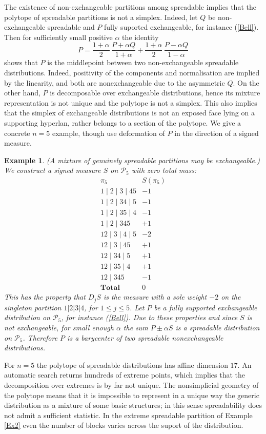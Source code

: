 \documentclass{article}
\newtheorem{example}{Example}
\begin{document}
The existence of non-exchangeable partitions among spreadable implies that the polytope of spreadable partitions is not a simplex.
Indeed, let $Q$ be non-exchangeable spreadable and $P$ fully suported exchangeable, for instance (\ref{Bell}). Then  for sufficiently small
positive $\alpha$ the identity
$$ P=\frac{1+\alpha}{2}  \,\frac{P+\alpha Q}{1+\alpha}+ \frac{1+\alpha}{2}\,  \frac{P-\alpha Q}{1-\alpha}$$
shows that $P$ is the middlepoint between two non-exchangeable spreadable distributions. Indeed, positivity of the components and normalisation are implied by the linearity,
and both are nonexchangeable due to the asymmetric $Q$. On the other hand, $P$ is decomposable over exchangeable distributions, hence its mixture  representation is not unique
and the polytope is not a simplex. 
This also implies that the simplex of exchangeable distributions is not an exposed face lying on a supporting hyperlan, rather belongs to a section of the polytope.
We give a concrete $n=5$ example, though use deformation of $P$ in the direction of a signed measure.


\begin{example}\label{Ex3}{\rm
(A mixture of genuinely spreadable partitions may be exchangeable.)
 We construct a {\it signed} measure $S$ on ${\mathcal P}_5$ with zero total mass:
\[
\begin{array}{l|r}
\pi_5 & S(\pi_5) \\
\hline
1 \mid 2 \mid 3 \mid 45 & -1 \\
1 \mid 2 \mid 34 \mid 5 & -1 \\
1 \mid 2 \mid 35 \mid 4 & -1 \\
1 \mid 2 \mid 345      & +1 \\[1mm]
12 \mid 3 \mid 4 \mid 5 & -2 \\[1mm]
12 \mid 3 \mid 45      & +1 \\
12 \mid 34 \mid 5      & +1 \\
12 \mid 35 \mid 4      & +1 \\
12 \mid 345            & -1 \\
\hline
\textbf{Total} & 0
\end{array}
\]
This has the property that $D_j S$ is the measure with a sole weight $-2$ on the singleton partition $1|2|3|4$,
for $1\leq j\leq 5$. Let $P$ be a fully supported exchangeable distribution on $\mathcal P_5$, for instance (\ref{Bell}).
Due to these properties and since $S$ is not exchangeable, for small enough $\alpha$ the sum $P\pm\alpha S$ is a spreadable distribution on $\mathcal P_5$. Therefore $P$ is a barycenter of two spreadable nonexchangeable distributions.
}
\end{example}
\vskip0.0cm
For $n=5$ the polytope of spreadable distributions has affine dimension $17$.
An automatic search returns hundreds of extreme points, which implies that the
decomposition over  extremes  is by far not unique.
The nonsimplicial geometry of the   polytope  means 
that it is impossible to represent in a unique way the generic distribution as a mixture of some basic structures;
in this sense spreadability does not admit a sufficient statistic. 
In  the extreme spreadable partition of Example \ref{Ex2}  even the number of blocks varies across the suport of the distribution.
\end{document}
